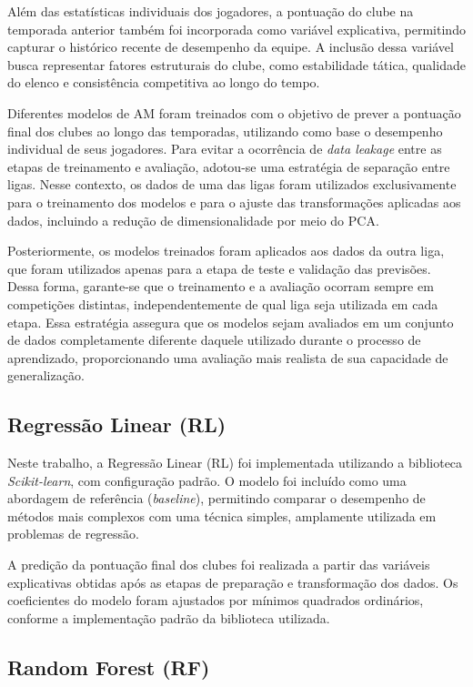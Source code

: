 Além das estatísticas individuais dos jogadores, a pontuação do clube na temporada anterior também foi incorporada como variável explicativa, permitindo capturar 
o histórico recente de desempenho da equipe. A inclusão dessa variável busca representar fatores estruturais do clube, como estabilidade tática, qualidade do elenco 
e consistência competitiva ao longo do tempo.

Diferentes modelos de AM foram treinados com o objetivo de prever a pontuação final dos clubes ao longo das temporadas, utilizando como base o 
desempenho individual de seus jogadores. Para evitar a ocorrência de \textit{data leakage} entre as etapas de treinamento e avaliação, adotou-se uma estratégia de 
separação entre ligas. Nesse contexto, os dados de uma das ligas foram utilizados exclusivamente para o treinamento dos modelos e para o ajuste das transformações 
aplicadas aos dados, incluindo a redução de dimensionalidade por meio do PCA.

Posteriormente, os modelos treinados foram aplicados aos dados da outra liga, que foram utilizados apenas para a etapa de teste e validação das previsões. Dessa forma, 
garante-se que o treinamento e a avaliação ocorram sempre em competições distintas, independentemente de qual liga seja utilizada em cada etapa. Essa estratégia 
assegura que os modelos sejam avaliados em um conjunto de dados completamente diferente daquele utilizado durante o processo de aprendizado, proporcionando uma 
avaliação mais realista de sua capacidade de generalização.

\subsection{Regressão Linear (RL)}

Neste trabalho, a Regressão Linear (RL) foi implementada utilizando a biblioteca \textit{Scikit-learn}, com configuração padrão. 
O modelo foi incluído como uma abordagem de referência (\textit{baseline}), permitindo comparar o desempenho de métodos mais complexos 
com uma técnica simples, amplamente utilizada em problemas de regressão.

A predição da pontuação final dos clubes foi realizada a partir das variáveis explicativas obtidas após as etapas de preparação e transformação dos dados. 
Os coeficientes do modelo foram ajustados por mínimos quadrados ordinários, conforme a implementação padrão da biblioteca utilizada.

\subsection{Random Forest (RF)}

